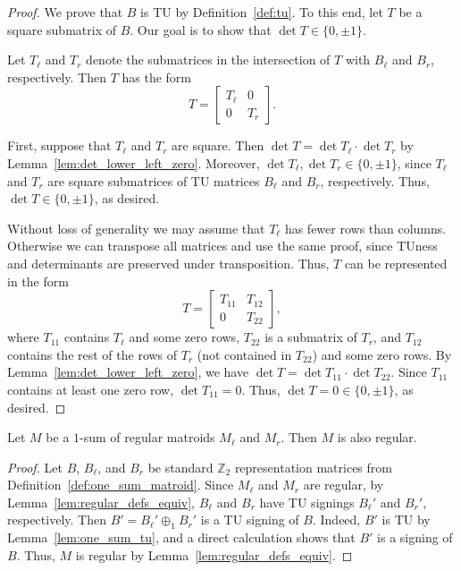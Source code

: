 \begin{proof}
    \leanok
    We prove that $B$ is TU by Definition~\ref{def:tu}. To this end, let $T$ be a square submatrix of $B$. Our goal is to show that $\det T \in \{0, \pm 1\}$.

    Let $T_{\ell}$ and $T_{r}$ denote the submatrices in the intersection of $T$ with $B_{\ell}$ and $B_{r}$, respectively. Then $T$ has the form
    \[
        T = \begin{bmatrix} T_{\ell} & 0 \\ 0 & T_{r} \end{bmatrix}.
    \]

    First, suppose that $T_{\ell}$ and $T_{r}$ are square. Then $\det T = \det T_{\ell} \cdot \det T_{r}$ by Lemma~\ref{lem:det_lower_left_zero}. Moreover, $\det T_{\ell}, \det T_{r} \in \{0, \pm 1\}$, since $T_{\ell}$ and $T_{r}$ are square submatrices of TU matrices $B_{\ell}$ and $B_{r}$, respectively. Thus, $\det T \in \{0, \pm 1\}$, as desired.

    Without loss of generality we may assume that $T_{\ell}$ has fewer rows than columns. Otherwise we can transpose all matrices and use the same proof, since TUness and determinants are preserved under transposition. Thus, $T$ can be represented in the form
    \[
        T = \begin{bmatrix} T_{11} & T_{12} \\ 0 & T_{22} \end{bmatrix},
    \]
    where $T_{11}$ contains $T_{\ell}$ and some zero rows, $T_{22}$ is a submatrix of $T_{r}$, and $T_{12}$ contains the rest of the rows of $T_{r}$ (not contained in $T_{22}$) and some zero rows. By Lemma~\ref{lem:det_lower_left_zero}, we have $\det T = \det T_{11} \cdot \det T_{22}$. Since $T_{11}$ contains at least one zero row, $\det T_{11} = 0$. Thus, $\det T = 0 \in \{0, \pm 1\}$, as desired.
\end{proof}

\begin{theorem}
    \label{thm:one_sum_regular}
    \leanok
    Let $M$ be a $1$-sum of regular matroids $M_{\ell}$ and $M_{r}$. Then $M$ is also regular.
\end{theorem}

\begin{proof}
    \leanok
    Let $B$, $B_{\ell}$, and $B_{r}$ be standard $\mathbb{Z}_{2}$ representation matrices from Definition~\ref{def:one_sum_matroid}. Since $M_{\ell}$ and $M_{r}$ are regular, by Lemma~\ref{lem:regular_defs_equiv}, $B_{\ell}$ and $B_{r}$ have TU signings $B_{\ell}'$ and $B_{r}'$, respectively. Then $B' = B_{\ell}' \oplus_{1} B_{r}'$ is a TU signing of $B$. Indeed, $B'$ is TU by Lemma~\ref{lem:one_sum_tu}, and a direct calculation shows that $B'$ is a signing of $B$. Thus, $M$ is regular by Lemma~\ref{lem:regular_defs_equiv}.
\end{proof}
